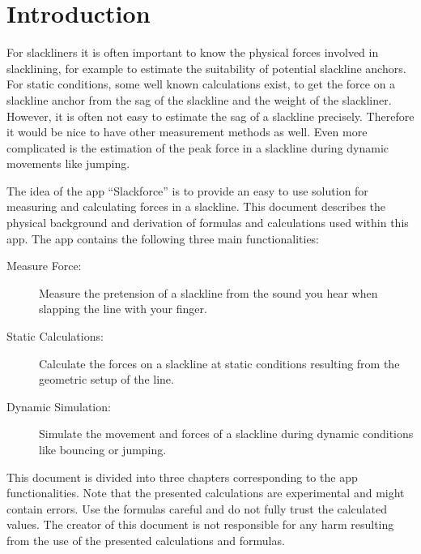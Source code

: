 
\chapter{Introduction}

For slackliners it is often important to know the physical forces involved in slacklining, for example to estimate the suitability of potential slackline anchors. For static conditions, some well known calculations exist, to get the force on a slackline anchor from the sag of the slackline and the weight of the slackliner. However, it is often not easy to estimate the sag of a slackline precisely. Therefore it would be nice to have other measurement methods as well. Even more complicated is the estimation of the peak force in a slackline during dynamic movements like jumping.

The idea of the app ``Slackforce'' is to provide an easy to use solution for measuring and calculating forces in a slackline. This document describes the physical background and derivation of formulas and calculations used within this app. The app contains the following three main functionalities:

\begin{description}
	\item[Measure Force:] Measure the pretension of a slackline from the sound you hear when slapping the line with your finger.
	\item[Static Calculations:] Calculate the forces on a slackline at static conditions resulting from the geometric setup of the line.
	\item[Dynamic Simulation:] Simulate the movement and forces of a slackline during dynamic conditions like bouncing or jumping.
\end{description}

This document is divided into three chapters corresponding to the app functionalities. Note that the presented calculations are experimental and might contain errors. Use the formulas careful and do not fully trust the calculated values. The creator of this document is not responsible for any harm resulting from the use of the presented calculations and formulas.